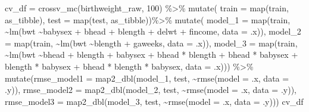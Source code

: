 \documentclass[
]{article}
\newenvironment{Shaded}{\begin{snugshade}}{\end{snugshade}}
\newcommand{\AttributeTok}[1]{\textcolor[rgb]{0.77,0.63,0.00}{#1}}
\newcommand{\DecValTok}[1]{\textcolor[rgb]{0.00,0.00,0.81}{#1}}
\newcommand{\FunctionTok}[1]{\textcolor[rgb]{0.00,0.00,0.00}{#1}}
\newcommand{\NormalTok}[1]{#1}
\newcommand{\OtherTok}[1]{\textcolor[rgb]{0.56,0.35,0.01}{#1}}
\newcommand{\SpecialCharTok}[1]{\textcolor[rgb]{0.00,0.00,0.00}{#1}}
\begin{document}
\begin{Shaded}
\begin{Highlighting}[]
\NormalTok{cv\_df }\OtherTok{=}
  \FunctionTok{crossv\_mc}\NormalTok{(birthweight\_raw, }\DecValTok{100}\NormalTok{) }\SpecialCharTok{\%\textgreater{}\%}
  \FunctionTok{mutate}\NormalTok{(}
    \AttributeTok{train =} \FunctionTok{map}\NormalTok{(train, as\_tibble),}
    \AttributeTok{test =} \FunctionTok{map}\NormalTok{(test, as\_tibble))}\SpecialCharTok{\%\textgreater{}\%}
  \FunctionTok{mutate}\NormalTok{(}
    \AttributeTok{model\_1  =} \FunctionTok{map}\NormalTok{(train, }\SpecialCharTok{\textasciitilde{}}\FunctionTok{lm}\NormalTok{(bwt }\SpecialCharTok{\textasciitilde{}}\NormalTok{babysex }\SpecialCharTok{+}\NormalTok{ bhead }\SpecialCharTok{+}\NormalTok{ blength }\SpecialCharTok{+}\NormalTok{ delwt }\SpecialCharTok{+}\NormalTok{ fincome, }\AttributeTok{data =}\NormalTok{ .x)),}
    \AttributeTok{model\_2  =} \FunctionTok{map}\NormalTok{(train, }\SpecialCharTok{\textasciitilde{}}\FunctionTok{lm}\NormalTok{(bwt }\SpecialCharTok{\textasciitilde{}}\NormalTok{blength }\SpecialCharTok{+}\NormalTok{ gaweeks, }\AttributeTok{data =}\NormalTok{ .x)),}
    \AttributeTok{model\_3  =} \FunctionTok{map}\NormalTok{(train, }\SpecialCharTok{\textasciitilde{}}\FunctionTok{lm}\NormalTok{(bwt }\SpecialCharTok{\textasciitilde{}}\NormalTok{bhead }\SpecialCharTok{+}\NormalTok{ blength }\SpecialCharTok{+}\NormalTok{ babysex }\SpecialCharTok{+} 
\NormalTok{              bhead }\SpecialCharTok{*}\NormalTok{ blength }\SpecialCharTok{+}\NormalTok{ bhead }\SpecialCharTok{*}\NormalTok{ babysex }\SpecialCharTok{+}\NormalTok{ blength }\SpecialCharTok{*}\NormalTok{ babysex }\SpecialCharTok{+}\NormalTok{ bhead }\SpecialCharTok{*}\NormalTok{ blength }\SpecialCharTok{*}\NormalTok{ babysex,}
              \AttributeTok{data =}\NormalTok{ .x))) }\SpecialCharTok{\%\textgreater{}\%} 
  \FunctionTok{mutate}\NormalTok{(}\AttributeTok{rmse\_model1 =} 
        \FunctionTok{map2\_dbl}\NormalTok{(model\_1, test, }\SpecialCharTok{\textasciitilde{}}\FunctionTok{rmse}\NormalTok{(}\AttributeTok{model =}\NormalTok{ .x, }\AttributeTok{data =}\NormalTok{ .y)),}
        \AttributeTok{rmse\_model2 =} 
        \FunctionTok{map2\_dbl}\NormalTok{(model\_2, test, }\SpecialCharTok{\textasciitilde{}}\FunctionTok{rmse}\NormalTok{(}\AttributeTok{model =}\NormalTok{ .x, }\AttributeTok{data =}\NormalTok{ .y)),}
        \AttributeTok{rmse\_model3 =}
        \FunctionTok{map2\_dbl}\NormalTok{(model\_3, test, }\SpecialCharTok{\textasciitilde{}}\FunctionTok{rmse}\NormalTok{(}\AttributeTok{model =}\NormalTok{ .x, }\AttributeTok{data =}\NormalTok{ .y)))}
\NormalTok{cv\_df}
\end{Highlighting}
\end{Shaded}
\end{document}
